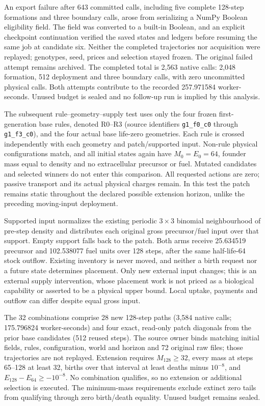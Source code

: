 An export failure after 643 committed calls, including five complete 128-step formations and three boundary calls, arose from serializing a NumPy Boolean eligibility field. The field was converted to a built-in Boolean, and an explicit checkpoint continuation verified the saved states and ledgers before resuming the same job at candidate six. Neither the completed trajectories nor acquisition were replayed; genotypes, seed, prices and selection stayed frozen. The original failed attempt remains archived. The completed total is 2,563 native calls: 2,048 formation, 512 deployment and three boundary calls, with zero uncommitted physical calls. Both attempts contribute to the recorded 257.971584 worker-seconds. Unused budget is sealed and no follow-up run is implied by this analysis.

The subsequent rule--geometry--supply test uses only the four frozen first-generation base rules, denoted R0--R3 (source identifiers \texttt{g1\_f0\_c0} through \texttt{g1\_f3\_c0}), and the four actual base life-zero geometries. Each rule is crossed independently with each geometry and patch/supported input. Non-rule physical configurations match, and all initial states again have $M_0=E_0=64$, founder mass equal to density and no extracellular precursor or fuel. Mutated candidates and selected winners do not enter this comparison. All requested actions are zero; passive transport and its actual physical charges remain. In this test the patch remains static throughout the declared possible extension horizon, unlike the preceding moving-input deployment.

Supported input normalizes the existing periodic $3\times3$ binomial neighbourhood of pre-step density and distributes each original gross precursor/fuel input over that support. Empty support falls back to the patch. Both arms receive 25.634519 precursor and 102.538077 fuel units over 128 steps, after the same half-life-64 stock outflow. Existing inventory is never moved, and neither a birth request nor a future state determines placement. Only new external input changes; this is an external supply intervention, whose placement work is not priced as a biological capability or asserted to be a physical upper bound. Local uptake, payments and outflow can differ despite equal gross input.

The 32 combinations comprise 28 new 128-step paths (3,584 native calls; 175.796824 worker-seconds) and four exact, read-only patch diagonals from the prior base candidates (512 reused steps). The source owner binds matching initial fields, rules, configuration, world and horizon and 72 original raw files; those trajectories are not replayed. Extension requires $M_{128}\geq32$, every mass at steps 65--128 at least 32, births over that interval at least deaths minus $10^{-8}$, and $E_{128}-E_{64}\geq-10^{-8}$. No combination qualifies, so no extension or additional selection is executed. The minimum-mass requirements exclude extinct zero tails from qualifying through zero birth/death equality. Unused budget remains sealed.

